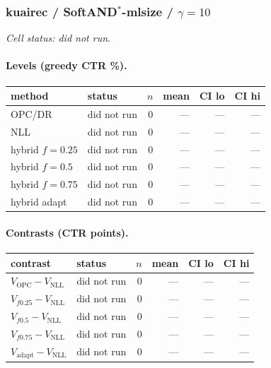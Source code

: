 \documentclass[10pt,a4paper]{article}
\begin{document}
\subsubsection{kuairec / SoftAND$^*$-mlsize / $\gamma=10$}
\emph{Cell status: did not run}.
\paragraph{Levels (greedy CTR \%).}
{\centering\small\begin{tabular}{llrrrr}
\toprule method & status & $n$ & mean & CI lo & CI hi \\
\midrule
OPC/DR & did not run & 0 & --- & --- & --- \\
NLL & did not run & 0 & --- & --- & --- \\
hybrid $f{=}0.25$ & did not run & 0 & --- & --- & --- \\
hybrid $f{=}0.5$ & did not run & 0 & --- & --- & --- \\
hybrid $f{=}0.75$ & did not run & 0 & --- & --- & --- \\
hybrid adapt & did not run & 0 & --- & --- & --- \\
\bottomrule\end{tabular}\par}
\paragraph{Contrasts (CTR points).}
{\centering\small\begin{tabular}{llrrrr}
\toprule contrast & status & $n$ & mean & CI lo & CI hi \\
\midrule
$V_{\mathrm{OPC}}-V_{\mathrm{NLL}}$ & did not run & 0 & --- & --- & --- \\
$V_{f0.25}-V_{\mathrm{NLL}}$ & did not run & 0 & --- & --- & --- \\
$V_{f0.5}-V_{\mathrm{NLL}}$ & did not run & 0 & --- & --- & --- \\
$V_{f0.75}-V_{\mathrm{NLL}}$ & did not run & 0 & --- & --- & --- \\
$V_{\mathrm{adapt}}-V_{\mathrm{NLL}}$ & did not run & 0 & --- & --- & --- \\
\bottomrule\end{tabular}\par}
\end{document}
